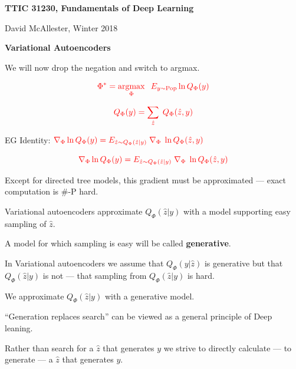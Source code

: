 



{\Huge

  \centerline{\bf TTIC 31230, Fundamentals of Deep Learning}
  \bigskip
  \centerline{David McAllester, Winter 2018}
  \vfill
  \centerline{\bf Variational Autoencoders}
  \vfill
  \vfill






We will now drop the negation and switch to argmax.

\vfill
$${\color{red} \Phi^* = \operatorname*{argmax}_\Phi \;\;E_{y \sim \mathrm{Pop}}  \ln Q_\Phi(y)}$$

\vfill
$${\color{red}Q_\Phi(y) = \sum_{\hat{z}} \; Q_\Phi(\hat{z},y)}$$

\vfill
EG Identity: \hspace{1em} ${\color{red} \nabla_\Phi \ln Q_\Phi(y) = E_{\hat{z} \sim Q_\Phi(\hat{z}|y)}\;\nabla_\Phi \;\ln Q_\Phi(\hat{z},y)}$

\bigskip
$${\color{red} \nabla_\Phi \ln Q_\Phi(y) = E_{\hat{z} \sim Q_\Phi(\hat{z}|y)}\;\nabla_\Phi \;\ln Q_\Phi(\hat{z},y)}$$

\vfill
Except for directed tree models, this gradient must be approximated --- exact computation is \#-P hard.

\vfill
Variational autoencoders approximate $Q_\Phi(\hat{z}|y)$ with a model supporting easy sampling of $\hat{z}$.


A model for which sampling is easy will be called {\bf generative}.

\vfill
In Variational autoencoders we assume that $Q_\Phi(y|\hat{z})$ is generative but that $Q_\Phi(\hat{z}|y)$ is not --- that sampling from
$Q_\Phi(\hat{z}|y)$ is hard.

\vfill
We approximate $Q_\Phi(\hat{z}|y)$ with a generative model.


``Generation replaces search'' can be viewed as a general principle of Deep leaning.

\vfill
Rather than search for a $\hat{z}$ that generates $y$ we strive to directly calculate --- to generate --- a $\hat{z}$ that generates $y$.

}
